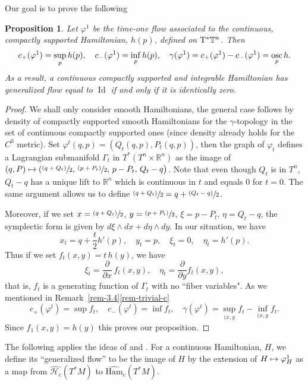\documentclass[JEP,XML,SOM,NoFloatCountersInSection,Unicode,published]{cedram}
\newcommand\mto{\mathchoice{\longmapsto}{\mapsto}{\mapsto}{\mapsto}}
\newcommand{\psfrac}[2]{\sfrac{(#1)}{#2}}
\numberwithin{equation}{section}
\DeclareMathOperator{\Id}{Id}
\newcommand {\DHam}{\mathrm{Ham}}
\newcommand{\gclDHamc}[1]{\widehat{\DHam}_c(#1)}
\let \phi \varphi
\theoremstyle{plain}
\newtheorem{proposition}[theorem]{Proposition}
\theoremstyle{definition}
\theoremstyle{remark}
\begin{document}
Our goal is to prove the following

\begin{proposition}\label{Prop-A.1}Let $\phi^{1}$ be the time-one flow associated to the continuous, compactly supported Hamiltonian, $h(p)$, defined on ${\rm T}^*{\mathbb T}^n$. Then
\[
c_+(\varphi ^1)= \sup_{p}h(p),\quad
c_-(\varphi^1)= \inf_{p}h(p),\quad\gamma (\varphi^1)=c_{+}(\varphi^{1})-c_{-}(\varphi^{1})=\operatornamewithlimits{osc}_{p}h.
\]
As a result, a continuous compactly supported and integrable Hamiltonian has generalized flow equal to $\Id$ if and only if it is identically zero.
\end{proposition}

\begin{proof}
We shall only consider smooth Hamiltonians, the general case follows by density of compactly supported smooth Hamiltonians for the $\gamma$-topology in the set of continuous
compactly supported ones (since density already holds for the $C^{0}$ metric).
Set $\varphi^{t}(q,p)=(Q _t(q,p),P_t(q,p))$, then the graph of $\varphi _t$
defines a Lagrangian submanifold $\Gamma _t$ in
$T^*(T^n\times {\mathbb R}^n)$ as the image of $(q,P)\mto
(\psfrac{q+Q_t}{2},\,
\psfrac{p+P_t}{2},\,p-P_t,\,Q _t-q \bigr)$. Note that even though $Q _t$ is in $T^n$,
$Q _t-q $ has a unique lift to ${\mathbb R} ^n$
which is continuous in $t$ and equals 0 for $t=0$. The
same argument allows us to define $\psfrac{q +Q
_t}{2}=q +\psfrac{Q _t-q }{2}$.

Moreover, if we set $x=\psfrac{q +Q _t}{2}$,
$y=\psfrac{p+P_t}{2}$, $\xi =p-P_t$, $\eta =Q
_t-q$, the symplectic form is given by $d\xi \wedge
dx+d\eta \wedge dy$. In our situation, we have
\[
x_t= q +\frac{t}{2}h'(p),\quad y_t=p,\quad
\xi _t=0,\quad \eta _t= h'(p).
\]
Thus if we set $f_t(x,y)=t\,h(y)$, we have
\[
\xi _t= \frac{\partial }{\partial x}\,
f_t(x,y),\quad \eta _t= \frac{\partial }{\partial y}f_t(x,y),
\]
that is, $f_t$ is a generating function of $\Gamma _t$
with no ``fiber variables". As we mentioned in Remark~\ref{rem-3.4}\eqref{rem-trivial-c}
\[
c_+(\varphi^t)= \sup_{} f_t,\quad
c_-(\varphi ^t)= \inf_{}f_t,\quad\gamma (\varphi ^t)= \sup_{(x,y}f_t-\inf_{(x,y}f_t.
\]
Since $f_1(x,y)=h(y)$ this proves our proposition.
\end{proof}

The following applies the ideas of \cite[\S 4.4, p.\,390]{Humiliere} and \cite[\S 3.3]{Humiliere2}. For a continuous Hamiltonian, $H$, we define its ``generalized flow'' to be
the image of $H$ by the extension of $H \mto \varphi_{H}^{1}$ as a map from $\widehat {\mathcal{H}_{c}}(T^{*}M)$ to
$\gclDHamc{T^{*}M}$.
\end{document}

